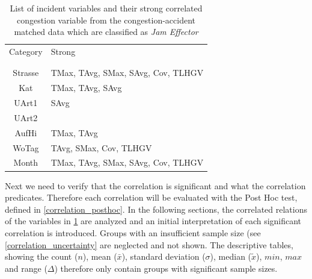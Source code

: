\noindent
\begin{table}[h!]
	\centering
	\begin{tabular}{c|l}  
		Category & Strong \\
		\\[-1em]
		\hline
		\\[-1em]
		Strasse & TMax, TAvg, SMax, SAvg, Cov, TLHGV \\ 
 		Kat & TMax, TAvg, SAvg \\ %
 		UArt1 & SAvg \\ %
 		UArt2 & \\ %
 		AufHi & TMax, TAvg \\
 		WoTag & TAvg, SMax, Cov, TLHGV \\ %
 		Month & TMax, TAvg, SMax, SAvg, Cov, TLHGV \\ %
	\end{tabular}
    \caption{List of incident variables and their strong correlated congestion variable from the congestion-accident matched data which are classified as \textit{Jam Effector}}
	\label{tbl:correlation_list_baysis_effector}
\end{table}

Next we need to verify that the correlation is significant and what the correlation predicates. Therefore each correlation will be evaluated with the Post Hoc test, defined in \cref{correlation_posthoc}. In the following sections, the correlated relations of the variables in \cref{tbl:correlation_list_baysis_effector} are analyzed and an initial interpretation of each significant correlation is introduced. Groups with an insufficient sample size (see \cref{correlation_uncertainty} are neglected and not shown. The descriptive tables, showing the count ($n$), mean ($\bar{x}$), standard deviation ($\sigma$), median ($\tilde{x}$), $min$, $max$ and range ($\Delta$) therefore only contain groups with significant sample sizes.

